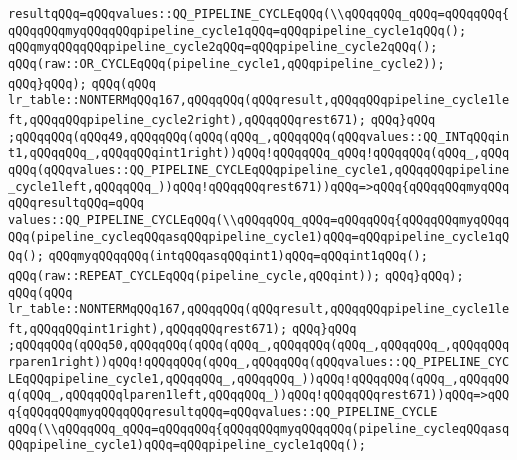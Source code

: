 \verb|resultqQQq=qQQqvalues::QQ_PIPELINE_CYCLEqQQq(\\qQQqqQQq_qQQq=qQQqqQQq{qQQqqQQqmyqQQqqQQqpipeline_cycle1qQQq=qQQqpipeline_cycle1qQQq();|\newline
\verb|qQQqmyqQQqqQQqpipeline_cycle2qQQq=qQQqpipeline_cycle2qQQq();|\newline
\verb|qQQq(raw::OR_CYCLEqQQq(pipeline_cycle1,qQQqpipeline_cycle2));|\newline
\verb|qQQq}qQQq);|\newline
\verb|qQQq(qQQq|\newline
\verb|lr_table::NONTERMqQQq167,qQQqqQQq(qQQqresult,qQQqqQQqpipeline_cycle1left,qQQqqQQqpipeline_cycle2right),qQQqqQQqrest671);|\newline
\verb|qQQq}qQQq|\newline
\verb|;qQQqqQQq(qQQq49,qQQqqQQq(qQQq(qQQq_,qQQqqQQq(qQQqvalues::QQ_INTqQQqint1,qQQqqQQq_,qQQqqQQqint1right))qQQq!qQQqqQQq_qQQq!qQQqqQQq(qQQq_,qQQqqQQq(qQQqvalues::QQ_PIPELINE_CYCLEqQQqpipeline_cycle1,qQQqqQQqpipeline_cycle1left,qQQqqQQq_))qQQq!qQQqqQQqrest671))qQQq=>qQQq{qQQqqQQqmyqQQqqQQqresultqQQq=qQQq|\newline
\verb|values::QQ_PIPELINE_CYCLEqQQq(\\qQQqqQQq_qQQq=qQQqqQQq{qQQqqQQqmyqQQqqQQq(pipeline_cycleqQQqasqQQqpipeline_cycle1)qQQq=qQQqpipeline_cycle1qQQq();|\newline
\verb|qQQqmyqQQqqQQq(intqQQqasqQQqint1)qQQq=qQQqint1qQQq();|\newline
\verb|qQQq(raw::REPEAT_CYCLEqQQq(pipeline_cycle,qQQqint));|\newline
\verb|qQQq}qQQq);|\newline
\verb|qQQq(qQQq|\newline
\verb|lr_table::NONTERMqQQq167,qQQqqQQq(qQQqresult,qQQqqQQqpipeline_cycle1left,qQQqqQQqint1right),qQQqqQQqrest671);|\newline
\verb|qQQq}qQQq|\newline
\verb|;qQQqqQQq(qQQq50,qQQqqQQq(qQQq(qQQq_,qQQqqQQq(qQQq_,qQQqqQQq_,qQQqqQQqrparen1right))qQQq!qQQqqQQq(qQQq_,qQQqqQQq(qQQqvalues::QQ_PIPELINE_CYCLEqQQqpipeline_cycle1,qQQqqQQq_,qQQqqQQq_))qQQq!qQQqqQQq(qQQq_,qQQqqQQq(qQQq_,qQQqqQQqlparen1left,qQQqqQQq_))qQQq!qQQqqQQqrest671))qQQq=>qQQq{qQQqqQQqmyqQQqqQQqresultqQQq=qQQqvalues::QQ_PIPELINE_CYCLE|\newline
\verb|qQQq(\\qQQqqQQq_qQQq=qQQqqQQq{qQQqqQQqmyqQQqqQQq(pipeline_cycleqQQqasqQQqpipeline_cycle1)qQQq=qQQqpipeline_cycle1qQQq();|\newline
